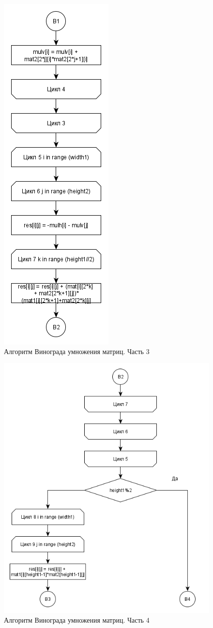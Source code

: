 \documentclass[a4paper,12pt]{report}
\begin{document}
	\begin{figure}[h!]
		\centering
		\includegraphics[width=0.4\linewidth]{part31.png}
		\caption{Алгоритм Винограда умножения матриц. Часть 3}
		\label{ris:wino3}
	\end{figure}

	\newpage
	
	\begin{figure}[h!]
		\centering
		\includegraphics[width=0.8\linewidth]{part41.png}
		\caption{Алгоритм Винограда умножения матриц. Часть 4}
		\label{ris:wino4}
	\end{figure}
\end{document}
